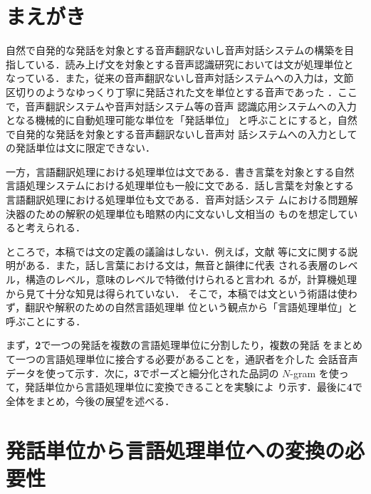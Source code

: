 

\maketitle



\section{まえがき}

自然で自発的な発話を対象とする音声翻訳ないし音声対話システムの構築を目
指している．読み上げ文を対象とする音声認識研究においては文が処理単位と
なっている．また，従来の音声翻訳ないし音声対話システムへの入力は，文節
区切りのようなゆっくり丁寧に発話された文を単位とする音声であった
\cite{Morimoto96}．ここで，音声翻訳システムや音声対話システム等の音声
認識応用システムへの入力となる機械的に自動処理可能な単位を「発話単位」
と呼ぶことにすると，自然で自発的な発話を対象とする音声翻訳ないし音声対
話システムへの入力としての発話単位は文に限定できない．

一方，言語翻訳処理における処理単位は文である．書き言葉を対象とする自然
言語処理システムにおける処理単位も一般に文である．話し言葉を対象とする
言語翻訳処理における処理単位も文である\cite{Furuse97}．音声対話システ
ムにおける問題解決器のための解釈の処理単位も暗黙の内に文ないし文相当の
ものを想定していると考えられる．

ところで，本稿では文の定義の議論はしない．例えば，文献\cite{Masuoka92}
等に文に関する説明がある．また，話し言葉における文は，無音と韻律に代表
される表層のレベル，構造のレベル，意味のレベルで特徴付けられると言われ
るが，計算機処理から見て十分な知見は得られていない\cite{Ishizaki96}．
そこで，本稿では文という術語は使わず，翻訳や解釈のための自然言語処理単
位という観点から「言語処理単位」と呼ぶことにする．

まず，{\bf 2}で一つの発話を複数の言語処理単位に分割したり，複数の発話
をまとめて一つの言語処理単位に接合する必要があることを，通訳者を介した
会話音声データを使って示す．次に，{\bf 3}でポーズと細分化された品詞の 
$N$-gram を使って，発話単位から言語処理単位に変換できることを実験によ
り示す．最後に{\bf 4}で全体をまとめ，今後の展望を述べる．

\section{発話単位から言語処理単位への変換の必要性}

